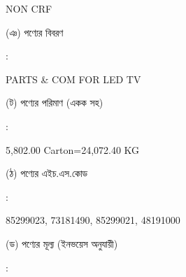\documentclass[12pt]{article}
\newcommand{\good}{PARTS \& COM FOR LED TV}
\newcommand{\pkg}{5,802.00 Carton=24,072.40 KG}
\newcommand{\hscode}{85299023, 73181490, 85299021, 48191000}
\newcommand{\crf}{NON CRF}
\newcommand{\crfdt}{}
\begin{document}
\begin{minipage}[t]{0.53\linewidth}
{\crf} \hspace{2em} {\crfdt}
\\
\end{minipage}
\begin{minipage}[t]{0.05\linewidth}
\hspace*{1em}
\end{minipage}
\begin{minipage}[t]{0.40\linewidth}
(ঞ) পণ্যের বিবরণ
\end{minipage}
\begin{minipage}[t]{0.02\linewidth}
:
\end{minipage}
\begin{minipage}[t]{0.53\linewidth}
{\good}
\\
\end{minipage}
\begin{minipage}[t]{0.05\linewidth}
\hspace*{1em}
\end{minipage}
\begin{minipage}[t]{0.40\linewidth}
(ট) পণ্যের পরিমাণ (একক সহ)
\end{minipage}
\begin{minipage}[t]{0.02\linewidth}
:
\end{minipage}
\begin{minipage}[t]{0.53\linewidth}
{\pkg}
\\
\end{minipage}
\begin{minipage}[t]{0.05\linewidth}
\hspace*{1em}
\end{minipage}
\begin{minipage}[t]{0.40\linewidth}
(ঠ) পণ্যের এইচ.এস.কোড
\end{minipage}
\begin{minipage}[t]{0.02\linewidth}
:
\end{minipage}
\begin{minipage}[t]{0.53\linewidth}
{\hscode}
\\
\end{minipage}
\begin{minipage}[t]{0.05\linewidth}
\hspace*{1em}
\end{minipage}
\begin{minipage}[t]{0.40\linewidth}
(ড) পণ্যের মূল্য (ইনভয়েস অনুযায়ী)
\end{minipage}
\begin{minipage}[t]{0.02\linewidth}
:
\end{minipage}
\end{document}
